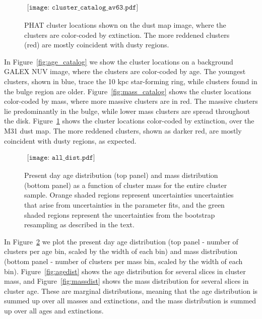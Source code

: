 \documentclass{emulateapj}
\begin{document}
\begin{figure}[ht!]
   \begin{center}$
      \begin{array}{cc}
         \texttt{[image: cluster\_catalog\_av63.pdf]} 
      \end{array}$
   \end{center}
  \caption{PHAT cluster locations shown on the dust map \citep{Draine07} image, where the clusters are color-coded by extinction.  The more reddened clusters (red) are mostly coincident with dusty regions.}
  \label{fig:av_catalog}
\end{figure}


In Figure~\ref{fig:age_catalog} we show the cluster locations on a background GALEX NUV image, where the clusters are color-coded by age.  The youngest clusters, shown in blue, trace the 10 kpc star-forming ring, while clusters found in the bulge region are older.  Figure~\ref{fig:mass_catalog} shows the cluster locations color-coded by mass, where more massive clusters are in red.  The massive clusters lie predominantly in the bulge, while lower mass clusters are spread throughout the disk.  Figure~\ref{fig:av_catalog} shows the cluster locations color-coded by extinction, over the M31 dust map.  The more reddened clusters, shown as darker red, are mostly coincident with dusty regions, as expected.



\begin{figure}[ht!]
   \begin{center}$
      \begin{array}{cc}
         \texttt{[image: all\_dist.pdf]} 
      \end{array}$
   \end{center}
  \caption{Present day age distribution (top panel) and mass distribution (bottom panel) as a function of cluster mass for the entire cluster sample.  Orange shaded regions represent uncertainties uncertainties that arise from uncertainties in the parameter fits, and the green shaded regions represent the uncertainties from the bootstrap resampling as described in the text.}
  \label{fig:distributions}
\end{figure}




In Figure~\ref{fig:distributions} we plot the present day age distribution (top panel - number of clusters per age bin, scaled by the width of each bin) and mass distribution (bottom panel - number of clusters per mass bin, scaled by the width of each bin).  Figure~\ref{fig:agedist} shows the age distribution for several slices in cluster mass, and Figure~\ref{fig:massdist} shows the mass distribution for several slices in cluster age.  These are marginal distributions, meaning that the age distribution is summed up over all masses and extinctions, and the mass distribution is summed up over all ages and extinctions.  
\end{document}
